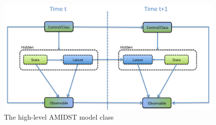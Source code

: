 \begin{figure}[ht!]
\begin{center}
\includegraphics[scale=0.4]{./figures/AMIDSTModelClassGeneral}
\caption{\label{Figure:AMIDSTModelClassHighLevel} The high-level AMIDST model class}
\end{center}
\end{figure}


 



%
